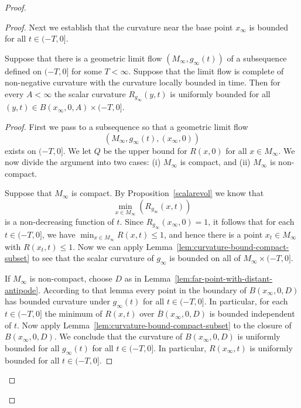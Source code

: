 \begin{proof}
\begin{proof}
Next we establish that the curvature near the base point $x_\infty$
is bounded for all $t\in (-T,0]$.

\begin{corollary}
\label{cor:curvature-bound-near-basepoint}
\label{ancientlimit}
Suppose that there is a geometric limit flow
$(M_\infty,g_\infty(t))$ of a subsequence defined on $(-T,0]$ for
some $T<\infty$. Suppose that the limit flow is complete of
non-negative curvature with the curvature locally bounded in time.
Then for every $A<\infty$ the scalar curvature $R_{g_\infty}(y,t)$
is uniformly bounded for all $(y,t)\in B(x_\infty,0,A)\times
(-T,0]$.
\end{corollary}

\begin{proof}
First we pass to a subsequence so that a geometric limit flow
$$(M_\infty,g_\infty(t),(x_\infty,0))$$ exists on  $(-T,0]$. We let
$Q$ be the upper bound for $R(x,0)$ for all $x\in M_\infty$. We now
divide the argument into two cases: (i) $M_\infty$ is compact, and
(ii) $M_\infty$ is non-compact.

Suppose that $M_\infty$ is compact. By Proposition~\ref{scalarevol}
we know that
$$\min_{x\in M_\infty}(R_{g_\infty}(x,t))$$
is a non-decreasing function of $t$. Since
$R_{g_\infty}(x_\infty,0)=1$, it follows that for each $t\in
(-T,0]$, we have $\min_{x\in M_\infty}R(x,t)\le 1$, and hence
there is a point $x_{t}\in M_\infty$ with $R(x_{t},t)\le 1$. Now we
can apply Lemma~\ref{lem:curvature-bound-compact-subset} to see that the scalar curvature of
$g_\infty$ is bounded on all of $M_\infty\times (-T,0]$.


If $M_\infty$ is non-compact, choose $D$ as in Lemma~\ref{lem:far-point-with-distant-antipode}.
According to that lemma every point in the boundary of
$B(x_\infty,0,D)$ has bounded curvature under $g_\infty(t)$ for all
$t\in (-T,0]$. In particular, for each $t\in (-T,0]$ the minimum of
$R(x,t)$ over $\overline B(x_\infty,0,D)$ is bounded independent of
$t$. Now apply Lemma~\ref{lem:curvature-bound-compact-subset} to the closure of
$B(x_\infty,0,D)$. We conclude that the curvature of
$B(x_\infty,0,D)$ is uniformly bounded for all $g_\infty(t)$ for all
$t\in (-T,0]$. In particular, $R(x_\infty,t)$ is uniformly bounded
for all $t\in (-T,0]$.



\end{proof}
\end{proof}
\end{proof}
